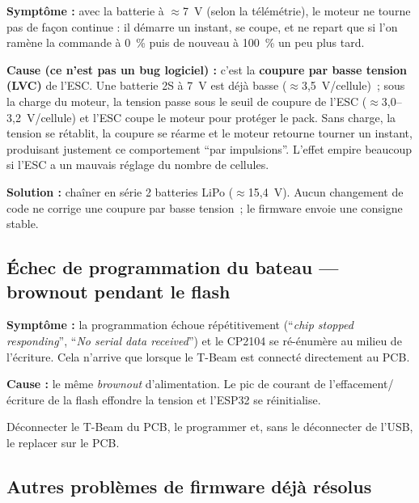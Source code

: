 \documentclass[12pt,a4paper]{article}
\begin{document}
\begin{warningbox}
  \textbf{Sympt\^ome :} avec la batterie à $\approx$7~V (selon la t\'el\'em\'etrie), le
  moteur ne tourne pas de fa\c{c}on continue : il d\'emarre un instant, se coupe, et
  ne repart que si l'on ram\`ene la commande à 0~\% puis de nouveau à 100~\% un peu
  plus tard.

  \textbf{Cause (ce n'est pas un bug logiciel) :} c'est la \textbf{coupure par basse
  tension (LVC)} de l'ESC. Une batterie 2S à 7~V est d\'ej\`a basse
  ($\approx$3,5~V/cellule)~; sous la charge du moteur, la tension passe sous le seuil
  de coupure de l'ESC ($\approx$3,0--3,2~V/cellule) et l'ESC coupe le moteur pour
  prot\'eger le pack. Sans charge, la tension se r\'etablit, la coupure se r\'earme et
  le moteur retourne tourner un instant, produisant justement ce comportement ``par
  impulsions''. L'effet empire beaucoup si l'ESC a un mauvais r\'eglage du nombre de
  cellules.
\end{warningbox}

\begin{okbox}
  \textbf{Solution :} cha\^iner en s\'erie 2 batteries LiPo ($\approx$15,4~V). Aucun
  changement de code ne corrige une coupure par basse tension~; le firmware envoie une
  consigne stable.
\end{okbox}

\subsection{\'Echec de programmation du bateau --- brownout pendant le flash}

\begin{warningbox}
  \textbf{Sympt\^ome :} la programmation \'echoue r\'ep\'etitivement (``\emph{chip
  stopped responding}'', ``\emph{No serial data received}'') et le CP2104 se
  r\'e-\'enum\`ere au milieu de l'\'ecriture. Cela n'arrive que lorsque le T-Beam est
  connect\'e directement au PCB.

  \textbf{Cause :} le m\^eme \emph{brownout} d'alimentation. Le pic de courant de
  l'effacement/\'ecriture de la flash effondre la tension et l'ESP32 se r\'einitialise.
\end{warningbox}

\begin{okbox}
  D\'econnecter le T-Beam du PCB, le programmer et, sans le d\'econnecter de l'USB, le
  replacer sur le PCB.
\end{okbox}

\subsection{Autres probl\`emes de firmware d\'ej\`a r\'esolus}
\end{document}
